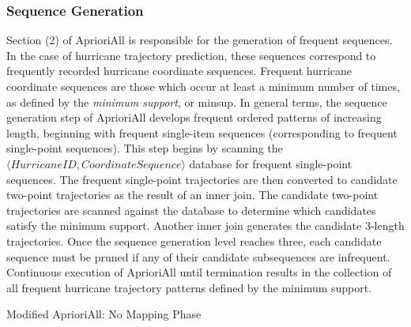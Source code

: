 \documentclass[12pt,conference]{IEEEtran}
\begin{document}
\subsubsection{Sequence Generation}

Section (2) of AprioriAll is responsible for the generation of frequent sequences. In the case of hurricane trajectory prediction, these sequences correspond to frequently recorded hurricane coordinate sequences. Frequent hurricane coordinate sequences are those which occur at least a minimum number of times, as defined by the \textit{minimum support}, or minsup. In general terms, the sequence generation step of AprioriAll develops frequent ordered patterns of increasing length, beginning with frequent single-item sequences (corresponding to frequent single-point sequences). This step begins by scanning the $\langle HurricaneID, CoordinateSequence\rangle$ database for frequent single-point sequences. The frequent single-point trajectories are then converted to candidate two-point trajectories as the result of an inner join. The candidate two-point trajectories are scanned against the database to determine which candidates satisfy the minimum support. Another inner join generates the candidate 3-length trajectories. Once the sequence generation level reaches three, each candidate sequence must be pruned if any of their candidate subsequences are infrequent. Continuous execution of AprioriAll until termination results in the collection of all frequent hurricane trajectory patterns defined by the minimum support.

\begin{algorithm}[H]
  \caption{Modified AprioriAll: No Mapping Phase}
  \label{aprioriall_for_hurricanes}
  \begin{algorithmic}[1]
    \EndFor
  \EndFor
  \end{algorithmic}
\end{algorithm}
\end{document}
